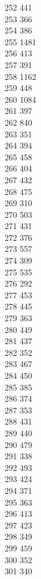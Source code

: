 { 252	441 \\
 253	366 \\
 254	386 \\
 255	1481 \\
 256	413 \\
 257	391 \\
 258	1162 \\
 259	448 \\
 260	1084 \\
 261	397 \\
 262	840 \\
 263	351 \\
 264	394 \\
 265	458 \\
 266	404 \\
 267	432 \\
 268	475 \\
 269	310 \\
 270	503 \\
 271	431 \\
 272	376 \\
 273	557 \\
 274	309 \\
 275	535 \\
 276	292 \\
 277	453 \\
 278	445 \\
 279	363 \\
 280	449 \\
 281	437 \\
 282	352 \\
 283	467 \\
 284	450 \\
 285	385 \\
 286	374 \\
 287	353 \\
 288	431 \\
 289	440 \\
 290	479 \\
 291	338 \\
 292	493 \\
 293	424 \\
 294	371 \\
 295	363 \\
 296	413 \\
 297	423 \\
 298	349 \\
 299	459 \\
 300	352 \\
 301	340 \\
}
